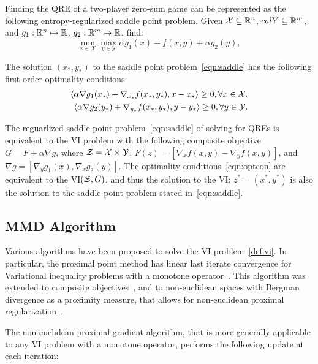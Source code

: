 Finding the QRE of a two-player zero-sum game can be represented as the following entropy-regularized saddle
point problem. Given $\mathcal{X} \subseteq \mathbb{R}^n$, $calY \subseteq \mathbb{R}^m$, and $g_1: \mathbb{R}^n \mapsto \mathbb{R}$, $g_2: \mathbb{R}^m \mapsto \mathbb{R}$, 
find:
\begin{equation}
	\label{eqn:saddle} \min_{x \in \mathcal{X}}
	\max_{y \in \mathcal{Y}} \alpha g_1(x) + f(x, y) + \alpha g_2(y),
\end{equation}

The solution $(x_{\ast}, y_{\ast})$ to the saddle point problem~\ref{eqn:saddle} has the following first-order optimality conditions:
\begin{equation}
	\label{eqn:optcon} 
	\begin{split}
		\langle \alpha \nabla g_1(x_*) + \nabla_{x_*}
		f(x_*, y_*), x - x_* \rangle \geq 0, \forall x \in \mathcal{X}. \\
		\langle \alpha \nabla g_2(y_*) + \nabla_{y_*} f(x_*, y_*),
		y - y_* \rangle \geq 0, \forall y \in \mathcal{Y}.
	\end{split}
\end{equation}

The reguarlized saddle point problem~\ref{eqn:saddle} of solving for QREs is equivalent to the VI problem 
with the following composite objective $G = F + \alpha \nabla g$,  where $\mathcal{Z} = \mathcal{X} \times \mathcal{Y}$, 
$F(z) = [\nabla_x f(x,y) - \nabla_y f(x,y)]$, and $\nabla g = [\nabla_y g_1(x), \nabla_x g_2(y)]$.
The optimality conditions~\ref{eqn:optcon} are equivalent to the VI$(\mathcal{Z}, G)$, and thus the solution 
to the VI: $z^* = (x^*, y^*)$ is also the solution to the saddle point problem stated in~\ref{eqn:saddle}.

\subsection{MMD Algorithm}

Various algorithms have been proposed to solve the VI problem~\ref{def:vi}.
In particular, the proximal point method has linear last iterate convergence for Variational 
inequality problems with a monotone operator~\cite{rockafellarMonotone1976}.
This algorithm was extended to composite objectives~\cite{tsenglinear1995}, and to non-euclidean 
spaces with Bergman divergence as a proximity measure, 
that allows for non-euclidean proximal regularization~\cite{tsengApproximation2010}.

The non-euclidean proximal gradient algorithm, that is more generally applicable to any VI problem
with a monotone operator, performs the following update at each iteration:

